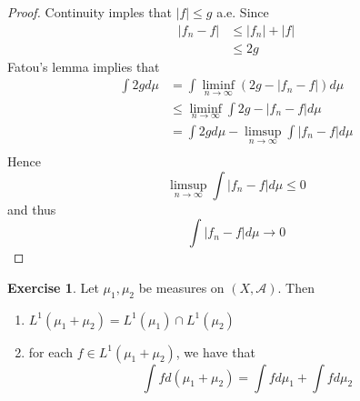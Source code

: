 \documentclass[12pt]{amsart}
\theoremstyle{definition}
\newtheorem{ex}[definition]{Exercise}
\newcommand{\MA}{\mathcal{A}}
\newcommand{\limfn}{\liminf \limits_{n \rightarrow \infty}}
\newcommand{\limpn}{\limsup \limits_{n \rightarrow \infty}}
\newcommand{\lex}[1]{\label{ex:#1}}
\begin{document}
	\begin{proof}
	Continuity imples that $|f| \leq g$ a.e. Since 
	\begin{align*}
	|f_n - f| 
	&\leq |f_n| + |f| \\
	&\leq 2g
	\end{align*}	 
	Fatou's lemma implies that 
	\begin{align*}
	\int 2g d\mu 
	&= \int \limfn (2g - |f_n - f|) d \mu \\
	&\leq \limfn \int 2g - |f_n - f| d \mu  \\
	&= \int 2g d \mu - \limpn \int |f_n -f| d\mu \\
	\end{align*}
	Hence $$ \limpn \int |f_n -f| d\mu \leq 0 $$ and thus $$\int |f_n -f| d\mu \rightarrow 0$$
	\end{proof}
	
	\begin{ex} \lex{00000} 
		Let $\mu_1, \mu_2$ be measures on $(X, \MA)$. Then
		\begin{enumerate}
			\item $L^1(\mu_1 + \mu_2) = L^1(\mu_1) \cap L^1(\mu_2)$
			
			\item for each $f \in L^1(\mu_1 + \mu_2)$, we have that $$\int f d(\mu_1 + \mu_2) = \int f d \mu_1 + \int f d\mu_2$$
		\end{enumerate}
		
	\end{ex}
	
\end{document}
